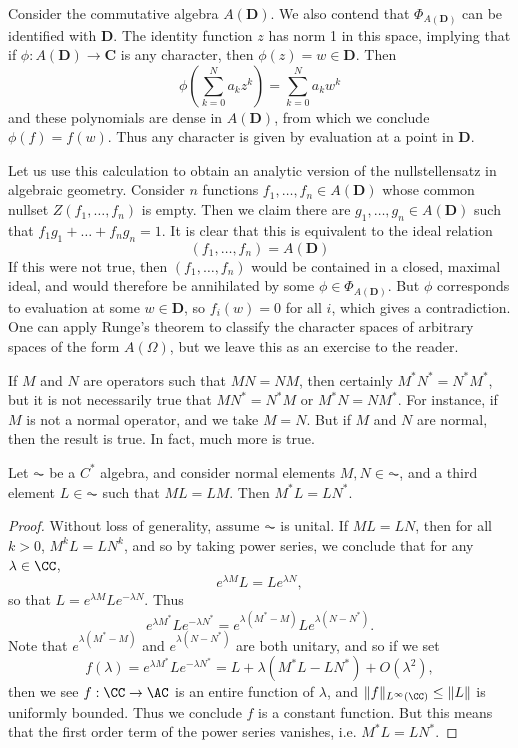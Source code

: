 \begin{example}
    Consider the commutative algebra $A(\mathbf{D})$. We also contend that $\Phi_{A(\mathbf{D})}$ can be identified with $\mathbf{D}$. The identity function $z$ has norm 1 in this space, implying that if $\phi: A(\mathbf{D}) \to \mathbf{C}$ is any character, then $\phi(z) = w \in \mathbf{D}$. Then
    \[ \phi(\sum_{k = 0}^N a_k z^k) = \sum_{k = 0}^N a_k w^k \]
    and these polynomials are dense in $A(\mathbf{D})$, from which we conclude $\phi(f) = f(w)$. Thus any character is given by evaluation at a point in $\mathbf{D}$.

    Let us use this calculation to obtain an analytic version of the nullstellensatz in algebraic geometry. Consider $n$ functions $f_1, \dots, f_n \in A(\mathbf{D})$ whose common nullset $Z(f_1,\dots,f_n)$ is empty. Then we claim there are $g_1,\dots,g_n \in A(\mathbf{D})$ such that $f_1 g_1 + \dots + f_n g_n = 1$. It is clear that this is equivalent to the ideal relation
    \[ (f_1, \dots, f_n) = A(\mathbf{D}) \]
    If this were not true, then $(f_1, \dots, f_n)$ would be contained in a closed, maximal ideal, and would therefore be annihilated by some $\phi \in \Phi_{A(\mathbf{D})}$. But $\phi$ corresponds to evaluation at some $w \in \mathbf{D}$, so $f_i(w) = 0$ for all $i$, which gives a contradiction. One can apply Runge's theorem to classify the character spaces of arbitrary spaces of the form $A(\Omega)$, but we leave this as an exercise to the reader.
\end{example}

If $M$ and $N$ are operators such that $MN = NM$, then certainly $M^*N^* = N^*M^*$, but it is not necessarily true that $MN^* = N^* M$ or $M^* N = N M^*$. For instance, if $M$ is not a normal operator, and we take $M = N$. But if $M$ and $N$ are normal, then the result is true. In fact, much more is true.

\begin{theorem}
    Let $\AC$ be a $C^*$ algebra, and consider normal elements $M,N \in \AC$, and a third element $L \in \AC$ such that $ML = LM$. Then $M^* L = L N^*$.
\end{theorem}
\begin{proof}
    Without loss of generality, assume $\AC$ is unital. If $ML = LN$, then for all $k > 0$, $M^kL = LN^k$, and so by taking power series, we conclude that for any $\lambda \in \CC$,
    \[ e^{\lambda M} L = L e^{\lambda N}, \]
    so that $L = e^{\lambda M} L e^{- \lambda N}$. Thus
    \[ e^{\lambda M^*} L e^{- \lambda N^*} = e^{\lambda (M^* - M)} L e^{\lambda (N - N^*)}. \]
    Note that $e^{\lambda(M^* - M)}$ and $e^{\lambda (N - N^*)}$ are both unitary, and so if we set
    \[ f(\lambda) = e^{\lambda M^*} L e^{- \lambda N^*} = L + \lambda (M^* L - L N^*) + O(\lambda^2), \]
    then we see $f: \CC \to \AC$ is an entire function of $\lambda$, and $\| f \|_{L^\infty(\CC)} \leq \| L \|$ is uniformly bounded. Thus we conclude $f$ is a constant function. But this means that the first order term of the power series vanishes, i.e. $M^* L = LN^*$.
\end{proof}

